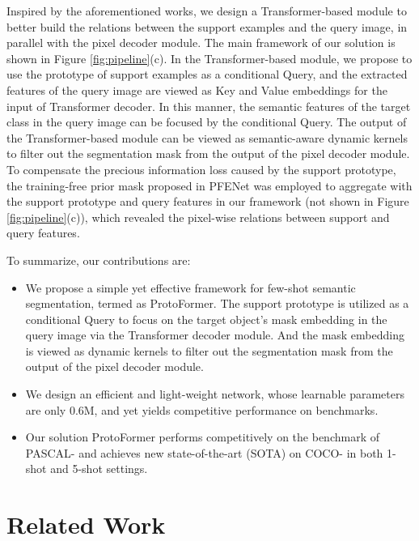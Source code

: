 \documentclass[journal]{IEEEtran}
\begin{document}
Inspired by the aforementioned works, we design a Transformer-based module to better build the relations between the support examples and the query image, in parallel with the pixel decoder module. The main framework of our solution is shown in Figure \ref{fig:pipeline}(c). In the Transformer-based module, we propose to use the prototype of support examples as a conditional Query, and the extracted features of the query image are viewed as Key and Value embeddings for the input of Transformer decoder. In this manner, the semantic features of the target class in the query image can be focused by the conditional Query. The output of the Transformer-based module can be viewed as semantic-aware dynamic kernels to filter out the segmentation mask from the output of the pixel decoder module. To compensate the precious information loss caused by the support prototype, the training-free prior mask proposed in PFENet\cite{pfenet} was employed to aggregate with the support prototype and query features in our framework (not shown in Figure \ref{fig:pipeline}(c)), which revealed the pixel-wise relations between support and query features. 

To summarize, our contributions are:
\begin{itemize}
    \item We propose a simple yet effective framework for few-shot semantic segmentation, termed as ProtoFormer. The support prototype is utilized as a conditional Query to focus on the target object’s mask embedding in the query image via the Transformer decoder module. And the mask embedding is viewed as dynamic kernels to filter out the segmentation mask from the output of the pixel decoder module.
    \item We design an efficient and light-weight network, whose learnable parameters are only 0.6M, and yet yields competitive performance on benchmarks.
    \item Our solution ProtoFormer performs competitively on the benchmark of PASCAL- and achieves new state-of-the-art (SOTA) on COCO- in both 1-shot and 5-shot settings.
\end{itemize}

\section{Related Work}
\end{document}
